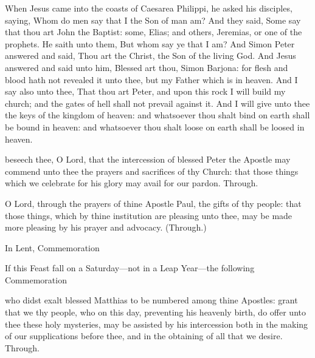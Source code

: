 
 When Jesus came into the coasts of Caesarea Philippi, he asked his disciples, saying, Whom do men say that I the Son of man am? And they said, Some say that thou art John the Baptist: some, Elias; and others, Jeremias, or one of the prophets. He saith unto them, But whom say ye that I am? And Simon Peter answered and said, Thou art the Christ, the Son of the living God. And Jesus answered and said unto him, Blessed art thou, Simon Barjona: for flesh and blood hath not revealed it unto thee, but my Father which is in heaven. And I say also unto thee, That thou art Peter, and upon this rock I will build my church; and the gates of hell shall not prevail against it. And I will give unto thee the keys of the kingdom of heaven: and whatsoever thou shalt bind on earth shall be bound in heaven: and whatsoever thou shalt loose on earth shall be loosed in heaven.

\clearpage
\secret
{} beseech thee, O Lord, that the intercession of blessed Peter the Apostle may commend unto thee the prayers and sacrifices of thy Church: that those things which we celebrate for his glory may avail for our pardon. Through.

 O Lord, through the prayers of thine Apostle Paul, the gifts of thy people: that those things, which by thine institution are pleasing unto thee, may be made more pleasing by his prayer and advocacy. (Through.)
\begin{rubric}
    In Lent, Commemoration %
\end{rubric}
\begin{rubric}
    If this Feast fall on a Saturday---not in a Leap Year---the following Commemoration 
\end{rubric}

 who didst exalt blessed Matthias to be numbered among thine Apostles: grant that we thy people, who on this day, preventing his heavenly birth, do offer unto thee these holy mysteries, may be assisted by his intercession both in the making of our supplications before thee, and in the obtaining of all that we desire. Through.

